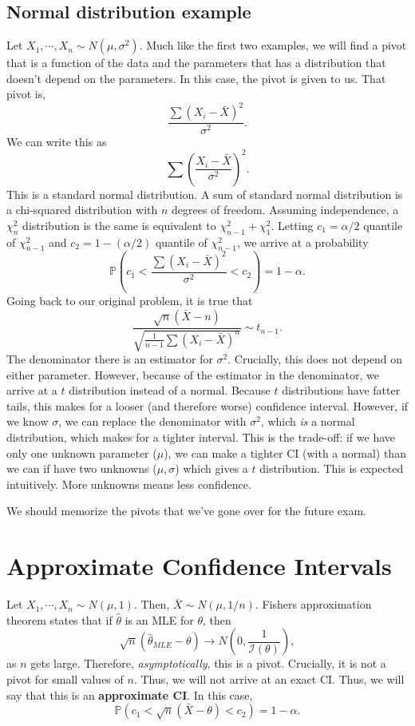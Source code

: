 \documentclass[titlepage, 12pt, leqno]{article}
\begin{document}
\subsection{Normal distribution example}
Let $X_{1}, \cdots ,X_{n} \sim N(\mu, \sigma^{2})$. Much like the first two
examples, we will find a pivot that is a function of the data and the parameters
that has a distribution that doesn't depend on the parameters. In this case, 
the pivot is given to us. That pivot is,
\[
\frac{\sum (X_{i} - \bar X)^{2}}{\sigma^{2}}.
\]
We can write this as 
\[
\sum \left(\frac{X_{i} - \bar X}{\sigma^{2}}\right)^{2}.
\]
This is a standard normal distribution. A sum of standard normal distribution
is a chi-squared distribution with $n$ degrees of freedom. Assuming independence,
a $\chi^{2}_{n}$ distribution is the same is equivalent to $\chi^{2}_{n-1} +
\chi^{2}_{1}$. Letting $c_{1} = \alpha/2$ quantile of $\chi^{2}_{n-1}$ and
$c_{2} = 1 - (\alpha/2)$ quantile of $\chi^{2}_{n-1}$, we arrive at a
probability
\[
\mathbb{P}(c_{1} < \frac{\sum (X_{i} - \bar X)^{2}}{\sigma^{2}} < c_{2}) =
1 - \alpha.
\]
Going back to our original problem, it is true that
\[
\frac{\sqrt{n}(\bar X - n)}{\sqrt{\frac{1}{n-1}\sum (X_{i} - \bar X)^{n}}}
\sim t_{n-1}.
\]
The denominator there is an estimator for $\sigma^{2}$. Crucially, this does not
depend on either parameter. However, because of the estimator in the
denominator, we arrive at a $t$ distribution instead of a normal. Because $t$
distributions have fatter tails, this makes for a looser (and therefore worse)
confidence interval. However, if we know $\sigma$, we can replace the denominator
with $\sigma^{2}$, which \textit{is} a normal distribution, which makes for a
tighter interval. This is the trade-off: if we have only one unknown parameter
($\mu$), we can make a tighter CI (with a normal) than we can if have two
unknowns ($\mu, \sigma$) which gives a $t$ distribution. This is expected
intuitively. More unknowns means less confidence.

\begin{note}
    We should memorize the pivots that we've gone over for the future exam.
\end{note}

\pagebreak
\section{Approximate Confidence Intervals}
Let $X_{1}, \cdots ,X_{n} \sim N(\mu,1)$. Then, $\bar X \sim N(\mu, 1/n)$.
Fishers approximation theorem states that if $\hat \theta$ is an MLE for
$\theta$, then
\[
\sqrt{n}(\hat \theta_{MLE} - \theta) \rightarrow N\left(0, \frac{1}{\mathcal{I}
    (\theta)}\right),
\]
as $n$ gets large. Therefore, \textit{asymptotically}, this is a pivot. Crucially,
it is not a pivot for small values of $n$. Thus, we will not arrive at an
exact CI. Thus, we will say that this is an \textbf{approximate CI}. In this
case,
\[
\mathbb{P}(c_{1} < \sqrt{n}(\bar X - \theta) < c_{2}) = 1 - \alpha.
\]
\end{document}
